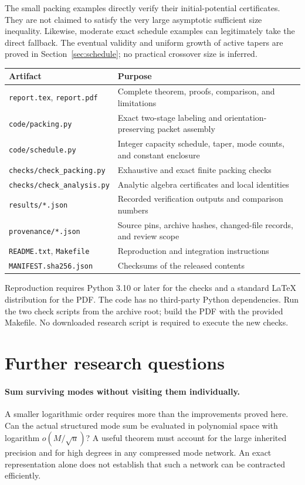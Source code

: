 \documentclass[11pt,letterpaper]{article}
\numberwithin{equation}{section}
\theoremstyle{definition}\newtheorem{definition}[theorem]{Definition}
\theoremstyle{remark}\newtheorem{remark}[theorem]{Remark}
\begin{document}
The small packing examples directly verify their initial-potential
certificates. They are not claimed to satisfy the very large asymptotic
sufficient size inequality. Likewise, moderate exact schedule examples
can legitimately take the direct fallback. The eventual validity and
uniform growth of active tapers are proved in
Section~\ref{sec:schedule}; no practical crossover size is inferred.

\begin{longtable}{@{}p{.37\linewidth}p{.55\linewidth}@{}}
\toprule
Artifact & Purpose\\
\midrule
\endhead
\texttt{report.tex}, \texttt{report.pdf} & Complete theorem, proofs, comparison, and limitations\\
\texttt{code/packing.py} & Exact two-stage labeling and orientation-preserving packet assembly\\
\texttt{code/schedule.py} & Integer capacity schedule, taper, mode counts, and constant enclosure\\
\texttt{checks/check\_packing.py} & Exhaustive and exact finite packing checks\\
\texttt{checks/check\_analysis.py} & Analytic algebra certificates and local identities\\
\texttt{results/*.json} & Recorded verification outputs and comparison numbers\\
\texttt{provenance/*.json} & Source pins, archive hashes, changed-file records, and review scope\\
\texttt{README.txt}, \texttt{Makefile} & Reproduction and integration instructions\\
\texttt{MANIFEST.sha256.json} & Checksums of the released contents\\
\bottomrule
\end{longtable}

Reproduction requires Python 3.10 or later for the checks and a standard
LaTeX distribution for the PDF. The code has no third-party Python
dependencies. Run the two check scripts from the archive root; build the
PDF with the provided Makefile. No downloaded research script is required
to execute the new checks.

\section{Further research questions}
\label{sec:future}

\paragraph{Sum surviving modes without visiting them individually.}
A smaller logarithmic order requires more than the improvements proved
here. Can the actual structured mode sum be evaluated in polynomial space
with logarithm $o(M/\sqrt u)$? A useful theorem must account for the
large inherited precision and for high degrees in any compressed
mode network. An exact representation alone does not establish that
such a network can be contracted efficiently.
\end{document}
